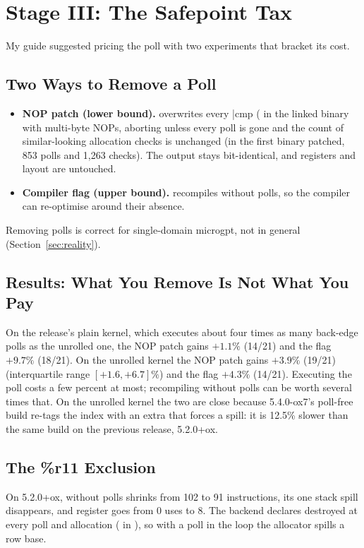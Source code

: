 \section{Stage III: The Safepoint Tax}
\label{sec:polls}

My guide suggested pricing the poll with two experiments that bracket its cost.

\subsection{Two Ways to Remove a Poll}
\begin{itemize}
  \item \textbf{NOP patch (lower bound).} 
        overwrites every \ainl|cmp (%
        in the linked binary with multi-byte NOPs, aborting unless every poll
        is gone and the count of similar-looking allocation checks is
        unchanged (in the first binary patched, 853 polls and 1,263 checks).
        The output stays bit-identical, and registers and layout are
        untouched.
  \item \textbf{Compiler flag (upper bound).} 
        recompiles without polls, so the compiler can re-optimise around
        their absence.
\end{itemize}

Removing polls is correct for single-domain microgpt, not in general
(Section~\ref{sec:reality}).

\subsection{Results: What You Remove Is Not What You Pay}
\label{fig:polls}
On the release's plain kernel, which executes about four times as many
back-edge polls as the unrolled one, the NOP patch gains
$+1.1\%$ (14/21) and the flag
$+9.7\%$ (18/21). On the unrolled kernel
the NOP patch gains $+3.9\%$ (19/21)
(interquartile range $[+1.6, +6.7]\%$)
and the flag $+4.3\%$ (14/21).
Executing the poll costs a few percent at most; recompiling without polls can
be worth several times that. On the unrolled kernel the two are close because
5.4.0-ox7's poll-free build re-tags the index with an extra  that
forces a spill: it is 12.5\%
slower than the same build on the previous release, 5.2.0+ox.

\subsection{The \texorpdfstring{\%r11}{r11} Exclusion}
\label{sec:r11}
On 5.2.0+ox, without polls  shrinks from 102 to 91 instructions, its one
stack spill disappears, and register  goes from 0 uses to 8. The
backend declares  destroyed at every poll and allocation
( in ), so with a
poll in the loop the allocator spills a row base.

